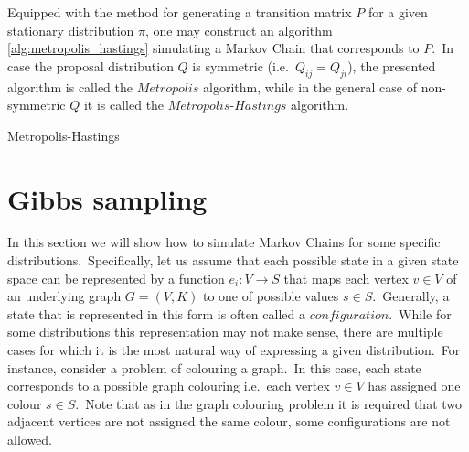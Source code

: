 \documentclass[a4paper, 11pt, onecolumn, openany, titlepage]{report}
\theoremstyle{default_theorem_style}\newtheorem{theorem}{Theorem}
\theoremstyle{default_theorem_style}\newtheorem{definition}{Definition}
\begin{document}
Equipped with the method for generating a transition matrix $P$ for a given stationary distribution $\pi$, one may
construct an algorithm \ref{alg:metropolis_hastings} simulating a Markov Chain that corresponds to $P$.\ In case the
proposal distribution $Q$ is symmetric (i.e.\ $Q_{ij} = Q_{ji}$), the presented algorithm is called the $Metropolis$
algorithm, while in the general case of non-symmetric $Q$ it is called the $Metropolis$-$Hastings$ algorithm.\newline


\begin{algorithm}[tb]
\caption{Metropolis-Hastings}\label{alg:metropolis_hastings}
\begin{algorithmic}[1]
\Else
\EndIf
{}
\end{algorithmic}
\end{algorithm}

\section{Gibbs sampling}

In this section we will show how to simulate Markov Chains for some specific distributions.\ Specifically, let us assume
that each possible state in a given state space can be represented by a function $e_i : V \to S$ that maps each vertex
$v \in V$ of an underlying graph $G = (V, K)$ to one of possible values $s \in S$.\ Generally, a state that is
represented in this form is often called a $configuration$.\ While for some distributions this
representation may not make sense, there are multiple cases for which it is the most natural way of expressing a
given distribution.\ For instance, consider a problem of colouring a graph.\ In this case, each state corresponds to a
possible graph colouring i.e.\ each vertex $v \in V$ has assigned one colour $s \in S$.\ Note that as in the graph
colouring problem it is required that two adjacent vertices are not assigned the same colour, some configurations
are not allowed.\newline
\end{document}
